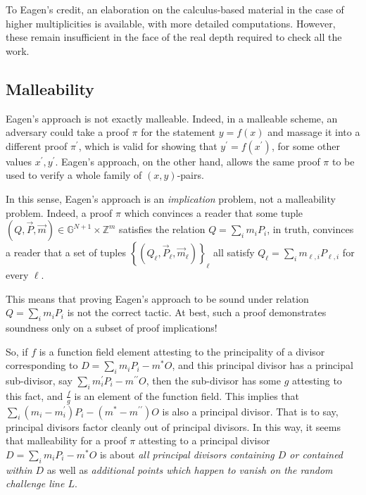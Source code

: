 \documentclass{article}
\theoremstyle{definition}
\newcommand{\6}{\mathbf}
\newcommand{\7}{\mathcal}
\begin{document}
To Eagen's credit, an elaboration on the calculus-based material in the case of higher multiplicities is available, with more detailed computations. However, these remain insufficient in the face of the real depth required to check all the work.





\subsection{Malleability}

Eagen's approach is not exactly malleable. 
Indeed, in a malleable scheme, an adversary could take a proof $\pi$ for the statement $y=f(x)$  and massage it into a different proof $\pi^\prime$, which is valid for showing that $y^\prime=f(x^\prime)$, for some other values $x^\prime, y^\prime$. 
Eagen's approach, on the other hand, allows the same proof $\pi$ to be used to verify a whole family of $(x,y)$-pairs. 

In this sense, Eagen's approach is an \textit{implication} problem, not a malleability problem. Indeed, a proof $\pi$ which convinces a reader that some tuple $(Q, \vec{P}, \vec{m}) \in \mathbb{G}^{N+1} \times \mathbb{Z}^m$ satisfies the relation $Q = \sum_i m_i P_i$, in truth, convinces a reader that a set of tuples $\left\{(Q_\ell, \vec{P}_\ell, \vec{m}_\ell)\right\}_{\ell}$ all satisfy $Q_\ell = \sum_i m_{\ell, i} P_{\ell, i}$ for every $\ell$.

This means that proving Eagen's approach to be sound under relation $Q = \sum_i m_i P_i$ is not the correct tactic. At best, such a proof demonstrates soundness only on a subset of proof implications! 

So, if $f$ is a function field element attesting to the principality of a divisor corresponding to $D=\sum_i m_i P_i - m^*O$, and this principal divisor has a principal sub-divisor, say $\sum_i m^\prime_i P_i - m^{\prime \prime}O$, then the sub-divisor has some $g$ attesting to this fact, and $\frac{f}{g}$ is an element of the function field. This implies that $\sum_i (m_i - m_i^\prime)P_i - (m^*-m^{\prime \prime})O$ is also a principal divisor. That is to say, principal divisors factor cleanly out of principal divisors. In this way, it seems that malleability for a proof $\pi$ attesting to a principal divisor $D = \sum_i m_i P_i - m^*O$ is about \textit{all principal divisors containing $D$ or contained within $D$} as well as \textit{additional points which happen to vanish on the random challenge line $L$}.
\end{document}
